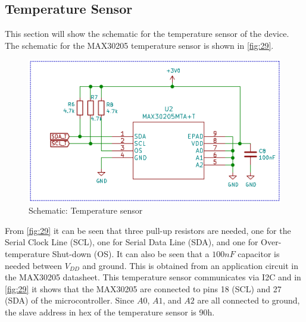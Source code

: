 \subsection{Temperature Sensor}
This section will show the schematic for the temperature sensor of the device. The schematic for the MAX30205 temperature sensor is shown in \autoref{fig:29}.
\begin{figure}[H]
	\centering
	\includegraphics[scale=0.6]{img/Schematic_Temp}
	\caption{Schematic: Temperature sensor}
	\label{fig:29}
\end{figure}
\noindent
From \autoref{fig:29} it can be seen that three pull-up resistors are needed, one for the Serial Clock Line (SCL), one for Serial Data Line (SDA), and one for Over-temperature Shut-down (OS). It can also be seen that a $ 100 nF $ capacitor is needed between $ V_{DD} $ and ground. This is obtained from an application circuit in the MAX30205 datasheet. This temperature sensor communicates via I2C and in \autoref{fig:29} it shows that the MAX30205 are connected to pins 18 (SCL) and 27 (SDA) of the microcontroller. Since $ A0 $, $ A1 $, and $ A2 $ are all connected to ground, the slave address in hex of the temperature sensor is 90h.
 
